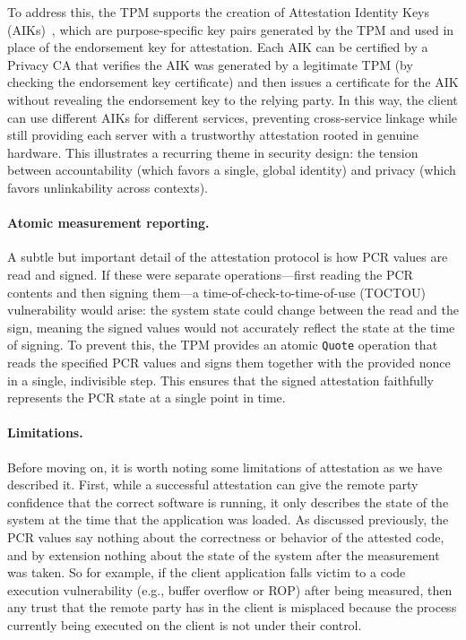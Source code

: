 \documentclass[11pt]{article}
\begin{document}
To address this, the TPM supports the creation of Attestation Identity Keys (AIKs)~\cite{BrickellDAA}, which are purpose-specific key pairs generated by the TPM and used in place of the endorsement key for attestation. Each AIK can be certified by a Privacy CA that verifies the AIK was generated by a legitimate TPM (by checking the endorsement key certificate) and then issues a certificate for the AIK without revealing the endorsement key to the relying party. In this way, the client can use different AIKs for different services, preventing cross-service linkage while still providing each server with a trustworthy attestation rooted in genuine hardware. This illustrates a recurring theme in security design: the tension between accountability (which favors a single, global identity) and privacy (which favors unlinkability across contexts).

\paragraph{Atomic measurement reporting.} A subtle but important detail of the attestation protocol is how PCR values are read and signed. If these were separate operations---first reading the PCR contents and then signing them---a time-of-check-to-time-of-use (TOCTOU) vulnerability would arise: the system state could change between the read and the sign, meaning the signed values would not accurately reflect the state at the time of signing. To prevent this, the TPM provides an atomic \texttt{Quote} operation that reads the specified PCR values and signs them together with the provided nonce in a single, indivisible step. This ensures that the signed attestation faithfully represents the PCR state at a single point in time.

\paragraph{Limitations.} Before moving on, it is worth noting some limitations of attestation as we have described it. First, while a successful attestation can give the remote party confidence that the correct software is running, it only describes the state of the system at the time that the application was loaded. As discussed previously, the PCR values say nothing about the correctness or behavior of the attested code, and by extension nothing about the state of the system after the measurement was taken. So for example, if the client application falls victim to a code execution vulnerability (e.g., buffer overflow or ROP) after being measured, then any trust that the remote party has in the client is misplaced because the process currently being executed on the client is not under their control.
\end{document}
